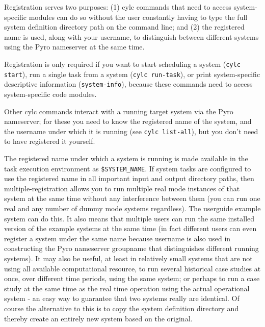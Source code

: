 Registration serves two purposes: (1) cylc commands that need to access
system-specific modules can do so without the user constantly having to
type the full system definition directory path on the command line; and
(2) the registered name is used, along with your username, to
distinguish between different systems using the Pyro nameserver at the
same time. 

Registration is only required if you want to start scheduling a system
(\lstinline=cylc start=), run a single task from a system 
(\lstinline=cylc run-task=), or print system-specific descriptive
information (\lstinline=system-info=), because these commands need to
access system-specific code modules.

Other cylc commands interact with a running target system via the Pyro
nameserver; for these you need to know the registered name of the
system, and the username under which it is running (see 
\lstinline=cylc list-all=), but you don't need to have registered it
yourself. 

The registered name under which a system is running is made available in
the task execution environment as \lstinline=$SYSTEM_NAME=.  If system
tasks are configured to use the registered name in all important input
and output directory paths, then multiple-registration allows you to run
multiple real mode instances of that system at the same time without any
interference between them (you can run one real and any number of dummy
mode systems regardless). The userguide example system can do this. It
also means that multiple users can run the same installed version of the
example systems at the same time (in fact different users can even
register a system under the same name because username is also used in
constructing the Pyro nameserver groupname that distinguishes different
running systems). It may also be useful, at least in relatively small
systems that are not using all available computational resource, to run
several historical case studies at once, over different time periods,
using the same system; or perhaps to run a case study at the same time
as the real time operation using the actual operational system - an easy
way to guarantee that two systems really are identical.  Of course the
alternative to this is to copy the system definition directory and
thereby create an entirely new system based on the original.

